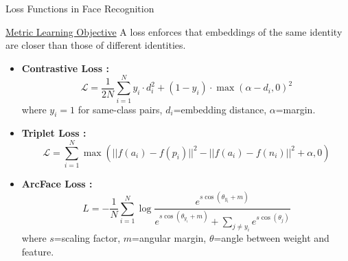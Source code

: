 \documentclass[pdfpagelabels=false, usepdftitle=false, aspectratio=169]{beamer}
\begin{document}
\begin{frame}[fragile]{Loss Functions in Face Recognition}
\scriptsize
\begin{block}{\href{https://arxiv.org/abs/1901.05555}{Metric Learning Objective}}
    A loss enforces that embeddings of the same identity are closer than those of different identities.
\end{block}
\begin{itemize}
    \item \textbf{Contrastive Loss :} %
    \[
    \mathcal{L} = \frac{1}{2N} \sum_{i=1}^N y_i \cdot d_i^2 + (1 - y_i) \cdot \max(\alpha - d_i, 0)^2
    \]
    where \(y_i = 1\) for same-class pairs, \(d_i\)=embedding distance, \(\alpha\)=margin.
    \item \textbf{Triplet Loss \citep{schroff2015facenet}:} 
    \[
    \mathcal{L} = \sum_{i=1}^N \max\left(||f(a_i) - f(p_i)||^2 - ||f(a_i) - f(n_i)||^2 + \alpha, 0\right)
    \]
    \item \textbf{ArcFace Loss \citep{deng2019arcface}:} 
    \[
    L = -\frac{1}{N} \sum_{i=1}^{N} \log \frac{e^{s \cos(\theta_{y_i} + m)}}{e^{s \cos(\theta_{y_i} + m)} + \sum_{j \neq y_i} e^{s \cos(\theta_j)}}
    \]
    where \(s\)=scaling factor, \(m\)=angular margin, \(\theta\)=angle between weight and feature.
\end{itemize}
\end{frame}
\end{document}
